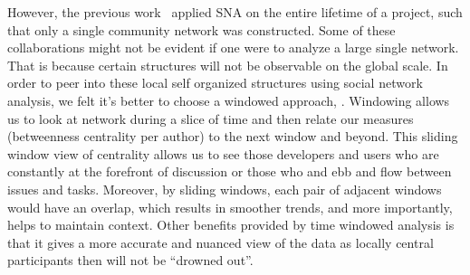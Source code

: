 \documentclass[conference]{IEEEtran}
\begin{document}
However, the previous work~\cite{MSR:christ,ACM:ashish} applied 
SNA on the entire lifetime of a project, such that only a single community network was constructed. 
Some of these collaborations might not be evident if one were to
analyze a large single network.
That is because certain structures will not be observable on the global scale.
In order to peer into these local self organized structures using
social network analysis, we felt it's better to choose a windowed approach, \cite{ICSEsocio:meneely}
\cite{ICSMwindowed:hindle}. 
Windowing allows us to look at network during a slice of time
and then relate our measures (betweenness centrality per author) to
the next window and beyond. 
This sliding window view of centrality allows us to see those
developers and users who are constantly at the forefront of discussion or
those who and ebb and flow between issues and tasks.
Moreover, by sliding windows, each pair of adjacent windows would have
an overlap, which results in smoother trends, and more importantly,
helps to maintain context. 
Other benefits provided by time windowed analysis is that it gives a more accurate and nuanced view of the data as 
locally central participants then will not be 
``drowned out''.





\end{document}
